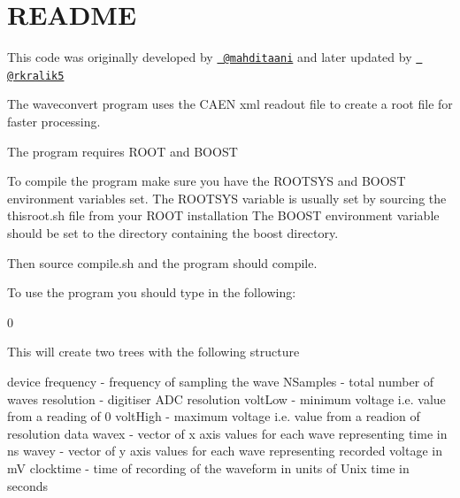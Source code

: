 \chapter{README}
\hypertarget{md_convert_2README}{}\label{md_convert_2README}
This code was originally developed by \href{https://github.com/mahditaani}{\texttt{ @mahditaani}} and later updated by \href{https://github.com/rkralik5}{\texttt{ @rkralik5}}

The waveconvert program uses the CAEN xml readout file to create a root file for faster processing.

The program requires ROOT and BOOST

To compile the program make sure you have the ROOTSYS and BOOST environment variables set. The ROOTSYS variable is usually set by sourcing the {\ttfamily thisroot.\+sh} file from your ROOT installation The BOOST environment variable should be set to the directory containing the {\ttfamily boost} directory.

Then source {\ttfamily compile.\+sh} and the program should compile.

To use the program you should type in the following\+: 
\begin{DoxyCode}{0}

\end{DoxyCode}


This will create two trees with the following structure

device frequency -\/ frequency of sampling the wave NSamples -\/ total number of waves resolution -\/ digitiser ADC resolution volt\+Low -\/ minimum voltage i.\+e. value from a reading of 0 volt\+High -\/ maximum voltage i.\+e. value from a readion of {\ttfamily resolution} data wavex -\/ vector of x axis values for each wave representing time in ns wavey -\/ vector of y axis values for each wave representing recorded voltage in mV clocktime -\/ time of recording of the waveform in units of Unix time in seconds 